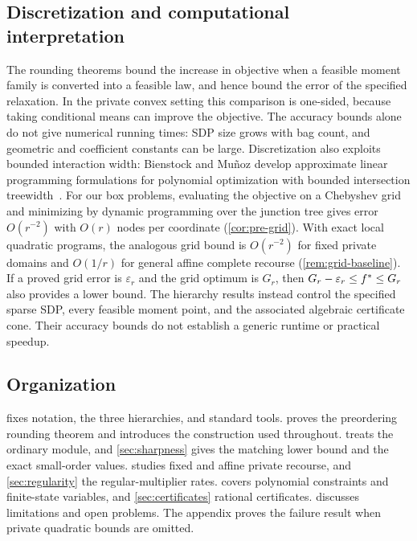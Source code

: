 \subsection{Discretization and computational interpretation}\label{sec:intro-limits}

The rounding theorems bound the increase in objective when a feasible moment
family is converted into a feasible law, and hence bound the error of the
specified relaxation. In the private convex setting this comparison is
one-sided, because taking conditional means can improve the objective.
The accuracy bounds alone do not give numerical running times: SDP size
grows with bag count, and geometric and coefficient constants can be large.
Discretization also exploits bounded interaction width: Bienstock and
Mu\~noz develop approximate linear programming formulations for polynomial
optimization with bounded intersection treewidth~\cite{bienstock2018-lp-formulations-for-polynomial-optimization}.
For our box problems, evaluating the objective on a Chebyshev grid and
minimizing by dynamic programming over the junction tree gives error
$O(r^{-2})$ with $O(r)$ nodes per coordinate (\cref{cor:pre-grid}).
With exact local
quadratic programs, the analogous grid bound is $O(r^{-2})$ for fixed
private domains and $O(1/r)$ for general affine complete recourse
(\cref{rem:grid-baseline}). If a proved grid error is $\varepsilon_r$ and
the grid optimum is $G_r$, then $G_r-\varepsilon_r\le f^{*}\le G_r$ also
provides a lower bound. The hierarchy results instead control the specified
sparse SDP, every feasible moment point, and the associated algebraic
certificate cone. Their accuracy bounds do not establish a generic runtime
or practical speedup.

\subsection{Organization}\label{sec:intro-organization}

 fixes notation, the three hierarchies, and standard tools.
 proves the preordering rounding theorem and introduces
the construction used throughout.  treats the ordinary
module, and \cref{sec:sharpness} gives the matching lower bound and the
exact small-order values.  studies fixed and affine
private recourse, and \cref{sec:regularity} the regular-multiplier rates.
 covers polynomial constraints and finite-state
variables, and \cref{sec:certificates} rational certificates.
 discusses limitations and open problems. The appendix
proves the failure result when private quadratic bounds are omitted.
